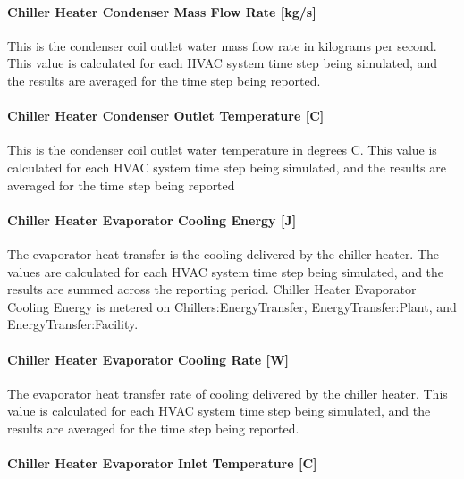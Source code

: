 \paragraph{Chiller Heater Condenser Mass Flow Rate {[}kg/s{]}}\label{chiller-heater-condenser-mass-flow-rate-kgs}

This is the condenser coil outlet water mass flow rate in kilograms per second. This value is calculated for each HVAC system time step being simulated, and the results are averaged for the time step being reported.

\paragraph{Chiller Heater Condenser Outlet Temperature {[}C{]}}\label{chiller-heater-condenser-outlet-temperature-c}

This is the condenser coil outlet water temperature in degrees C. This value is calculated for each HVAC system time step being simulated, and the results are averaged for the time step being reported

\paragraph{Chiller Heater Evaporator Cooling Energy {[}J{]}}\label{chiller-heater-evaporator-cooling-energy-j}

The evaporator heat transfer is the cooling delivered by the chiller heater. The values are calculated for each HVAC system time step being simulated, and the results are summed across the reporting period. Chiller Heater Evaporator Cooling Energy is metered on Chillers:EnergyTransfer, EnergyTransfer:Plant, and EnergyTransfer:Facility.

\paragraph{Chiller Heater Evaporator Cooling Rate {[}W{]}}\label{chiller-heater-evaporator-cooling-rate-w}

The evaporator heat transfer rate of cooling delivered by the chiller heater. This value is calculated for each HVAC system time step being simulated, and the results are averaged for the time step being reported.

\paragraph{Chiller Heater Evaporator Inlet Temperature {[}C{]}}\label{chiller-heater-evaporator-inlet-temperature-c}

